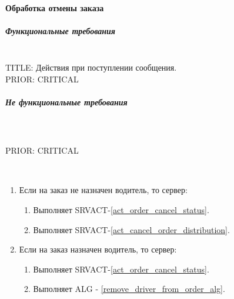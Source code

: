 \paragraph{Обработка отмены заказа}

      \subparagraph{Функциональные требования} \mbox{}\\

        TITLE: Действия при поступлении сообщения.
      	\\
      	PRIOR: CRITICAL\\

      \subparagraph{Не функциональные требования} \mbox{}\\

      	\\
      	PRIOR: CRITICAL\\

    	\begin{alg}\label{cancel_order_alg} \mbox{}\\

    		\begin{enumerate}
    			\item Если на заказ не назначен водитель, то сервер:
    			\begin{enumerate}
    				\item Выполняет SRVACT-\ref{act_order_cancel_status}.
    				\item Выполняет SRVACT-\ref{act_cancel_order_distribution}.
    			\end{enumerate}
    			\item Если на заказ назначен водитель, то сервер:
    			\begin{enumerate}
    				\item Выполняет SRVACT-\ref{act_order_cancel_status}.
    				\item Выполняет ALG - \ref{remove_driver_from_order_alg}.
    			\end{enumerate}
    		\end{enumerate}

    	\end{alg}

